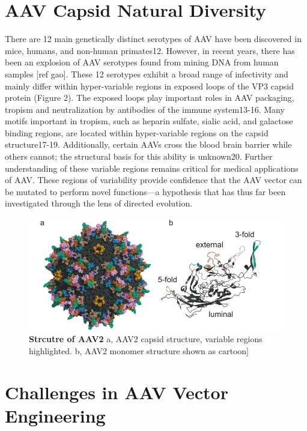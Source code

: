 \section{AAV Capsid Natural Diversity}

There are 12 main genetically distinct serotypes of AAV have been discovered in mice, humans, and non-human primates12. However, in recent years, there has been an explosion of AAV serotypes found from mining DNA from human samples [ref gao]. These 12 serotypes exhibit a broad range of infectivity and mainly differ within hyper-variable regions in exposed loops of the VP3 capsid protein (Figure 2). The exposed loops play important roles in AAV packaging, tropism and neutralization by antibodies of the immune system13-16. Many motifs important in tropism, such as heparin sulfate, sialic acid, and galactose binding regions, are located within hyper-variable regions on the capsid structure17-19. Additionally, certain AAVs cross the blood brain barrier while others cannot; the structural basis for this ability is unknown20. Further understanding of these variable regions remains critical for medical applications of AAV. These regions of variability provide confidence that the AAV vector can be mutated to perform novel functions—a hypothesis that has thus far been investigated through the lens of directed evolution. 

\begin{figure}
\includegraphics[width=\textwidth]{figures/20190612_viral_capdis_vr.pdf}
\caption[Structure of AAV2]{\textbf{Strcutre of AAV2}
a, AAV2 capsid structure, variable regions highlighted. b, AAV2 monomer structure shown as cartoon]
\label{fig:Figure 0.2}}
\end{figure}

\section{Challenges in AAV Vector Engineering}

